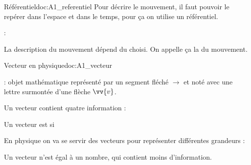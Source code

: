 \newpage
\vspace*{-34pt}
\begin{doc}{Référentiel}{doc:A1_referentiel}
  Pour décrire le mouvement, il faut pouvoir le repérer dans l’espace et dans le temps, pour ça on utilise un référentiel.
  
  \begin{importants}
     : 
  \end{importants}
  
  \begin{importants}
    La description du mouvement dépend du  choisi.
    On appelle ça la  du mouvement.
  \end{importants}
\end{doc}



\vspace*{-8pt}
\begin{doc}{Vecteur en physique}{doc:A1_vecteur}
  \begin{importants}
     : objet mathématique représenté par un segment fléché $\longrightarrow$ et noté avec une lettre surmontée d'une flèche $\vv{v}$.
    
    Un vecteur contient quatre information : 
    \begin{listePoints}[2]
      \item {}
      \item {}
      \item {}
      \item {}
    \end{listePoints}
  
    Un vecteur est  si
  \end{importants}
  
  \fleche En physique on va se servir des vecteurs pour représenter différentes grandeurs :
  
  \attention Un vecteur n'est  égal à un nombre, qui contient moins d'information.
\end{doc}


